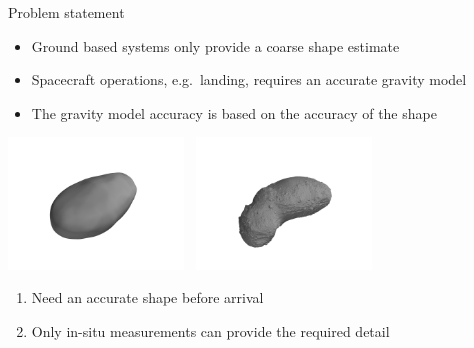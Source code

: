 \begin{frame}[t]{Problem statement}
    \begin{itemize}
        \item Ground based systems only provide a coarse shape estimate
        \item Spacecraft operations, e.g.\ landing, requires an accurate gravity model
        \item The gravity model accuracy is based on the accuracy of the shape
    \end{itemize}
    \pause
    \begin{center}
    \includegraphics[trim={25cm 15cm 25cm 15cm},clip,width=0.35\textwidth,height=0.5\textheight,keepaspectratio]{figures/mathematical_background/itokawa_radar_isometric.jpg}~
    \includegraphics[trim={25cm 12cm 25cm 15cm},clip,width=0.35\textwidth,height=0.5\textheight,keepaspectratio]{figures/mathematical_background/itokawa_isometric.jpg}
    \end{center}
    \begin{block}{}
        \begin{center}
            \begin{enumerate}
                \item Need an accurate shape before arrival
                \item Only in-situ measurements can provide the required detail
            \end{enumerate}
        \end{center}
    \end{block}
    
\end{frame}
